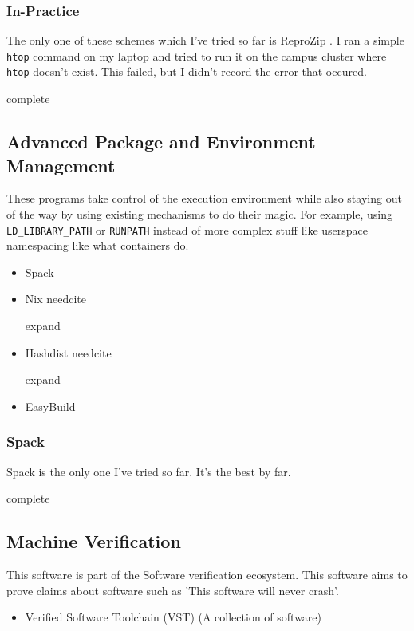 \documentclass[american]{article}
\newcommand{\complete}{
	\gls{complete}
}
\newcommand{\needcite}{
	\gls{needcite}
}
\newcommand{\expand}{
	\gls{expand}
}
\begin{document}
\subsubsection{In-Practice} \label{sec:software-watchers-practice}

The only one of these schemes which I've tried so far is ReproZip \cite{reprozip}. I ran a simple \texttt{htop} command on my laptop and tried to run it on the campus cluster where \texttt{htop} doesn't exist. This failed, but I didn't record the error that occured.

\complete

\subsection{Advanced Package and Environment Management} \label{sec:software-advanced}

These programs take control of the execution environment while also staying out of the way by using existing mechanisms to do their magic. For example, using \texttt{LD\_LIBRARY\_PATH} or \texttt{RUNPATH} instead of more complex stuff like userspace namespacing like what containers do.

\begin{itemize}
\item Spack \cite{Spack}
\item Nix \needcite \expand
\item Hashdist \needcite \expand
\item EasyBuild \cite{EasyBuild}
\end{itemize}

\subsubsection{Spack} \label{sec:spack}

Spack \cite{Spack} is the only one I've tried so far. It's the best by far.

\complete

\subsection{Machine Verification} \label{sec:software-verification}

This software is part of the Software verification ecosystem. This software aims to prove claims about software such as 'This software will never crash'.

\begin{itemize}
\item Verified Software Toolchain (VST) (A collection of software) \cite{appel-program-logics-2014}
\end{itemize}
\end{document}
